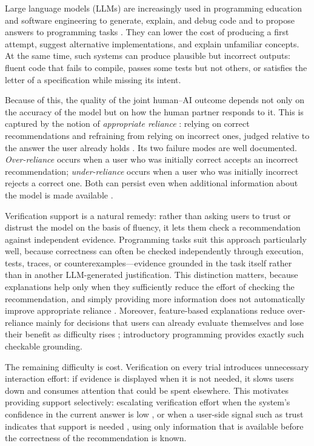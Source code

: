 \documentclass[oneside,final,14pt,a4paper]{extreport}
\begin{document}
Large language models (LLMs) are increasingly used in programming education and
software engineering to generate, explain, and debug code and to propose
answers to programming tasks \cite{Ma2024,Cambaz2024,Denny2024}. They can lower
the cost of producing a first attempt, suggest alternative implementations, and
explain unfamiliar concepts. At the same time, such systems can produce
plausible but incorrect outputs: fluent code that fails to compile, passes some
tests but not others, or satisfies the letter of a specification while missing
its intent.

Because of this, the quality of the joint human--AI outcome depends not only on
the accuracy of the model but on how the human partner responds to it. This is
captured by the notion of \emph{appropriate reliance} \cite{LeeSee2004}:
relying on correct recommendations and refraining from relying on incorrect
ones, judged relative to the answer the user already holds
\cite{Schemmer2023Appropriate}. Its two failure modes are well documented.
\emph{Over-reliance} occurs when a user who was initially correct accepts an
incorrect recommendation; \emph{under-reliance} occurs when a user who was
initially incorrect rejects a correct one. Both can persist even when additional
information about the model is made available
\cite{PoursabziSangdeh2021,Vasconcelos2022,Bo2025}.

Verification support is a natural remedy: rather than asking users to trust or
distrust the model on the basis of fluency, it lets them check a recommendation
against independent evidence. Programming tasks suit this approach particularly
well, because correctness can often be checked independently through execution,
tests, traces, or counterexamples---evidence grounded in the task itself rather
than in another LLM-generated justification. This distinction matters, because
explanations help only when they sufficiently reduce the effort of checking the
recommendation, and simply providing more information does not automatically
improve appropriate reliance
\cite{Bucinca2021,Vasconcelos2022,Bo2025,Schemmer2022}.
Moreover, feature-based explanations reduce over-reliance mainly for decisions
that users can already evaluate themselves and lose their benefit as difficulty
rises
\cite{Zhang2024Verify}; introductory programming provides exactly such checkable
grounding.

The remaining difficulty is cost. Verification on every trial introduces
unnecessary interaction effort: if evidence is displayed when it is not needed,
it slows users down and consumes attention that could be spent elsewhere. This
motivates providing support selectively: escalating verification effort when
the system's confidence in the current answer is low \cite{CascadedLM2025}, or
when a user-side signal such as trust indicates that support is needed
\cite{SrinivasanAdjustForTrust}, using only information that is available before
the correctness of the recommendation is known.
\end{document}
